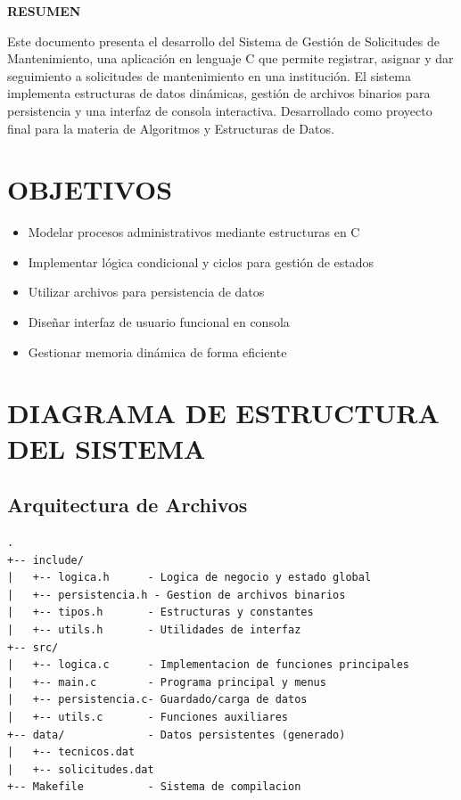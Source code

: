 \documentclass[12pt, a4paper]{article}
\begin{document}
\begin{center}
    \textbf{\large RESUMEN}
\end{center}
\vspace{0.5em}
\noindent Este documento presenta el desarrollo del Sistema de Gestión de Solicitudes de Mantenimiento, una aplicación en lenguaje C que permite registrar, asignar y dar seguimiento a solicitudes de mantenimiento en una institución. El sistema implementa estructuras de datos dinámicas, gestión de archivos binarios para persistencia y una interfaz de consola interactiva. Desarrollado como proyecto final para la materia de Algoritmos y Estructuras de Datos.
\vspace{1em}

\section{OBJETIVOS}
\begin{itemize}[left=0pt]
\item Modelar procesos administrativos mediante estructuras en C
\item Implementar lógica condicional y ciclos para gestión de estados
\item Utilizar archivos para persistencia de datos
\item Diseñar interfaz de usuario funcional en consola
\item Gestionar memoria dinámica de forma eficiente
\end{itemize}

\section{DIAGRAMA DE ESTRUCTURA DEL SISTEMA}

\subsection{Arquitectura de Archivos}
\begin{verbatim}
.
+-- include/
|   +-- logica.h      - Logica de negocio y estado global
|   +-- persistencia.h - Gestion de archivos binarios
|   +-- tipos.h       - Estructuras y constantes
|   +-- utils.h       - Utilidades de interfaz
+-- src/
|   +-- logica.c      - Implementacion de funciones principales
|   +-- main.c        - Programa principal y menus
|   +-- persistencia.c- Guardado/carga de datos
|   +-- utils.c       - Funciones auxiliares
+-- data/             - Datos persistentes (generado)
|   +-- tecnicos.dat
|   +-- solicitudes.dat
+-- Makefile          - Sistema de compilacion
\end{verbatim}
\end{document}
